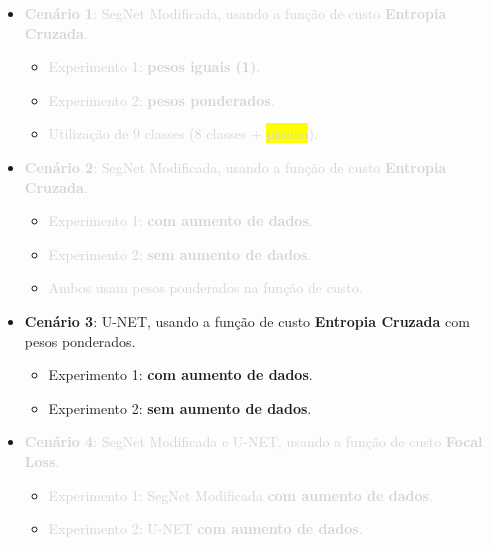 \documentclass[%
  10pt,%
  aspectratio = 169,%
  compress,%
  t,%
  english,%
  brazilian,%
  tikz,
]{beamer}
\begin{document}
\begin{frame}

    \begin{itemize}
        \item \textcolor{lightgray}{\textbf{Cenário 1}: SegNet Modificada, usando a função de custo \textbf{Entropia Cruzada}.}
        \begin{itemize}
            \item \textcolor{lightgray}{Experimento 1: \textbf{pesos iguais (1)}.}
            \item \textcolor{lightgray}{Experimento 2: \textbf{pesos ponderados}.}
            \item \textcolor{lightgray}{Utilização de 9 classes (8 classes + \colorbox{yellow}{piscina}).}
        \end{itemize}
    \end{itemize}
    \begin{itemize}
        \item \textcolor{lightgray}{\textbf{Cenário 2}: SegNet Modificada, usando a função de custo \textbf{Entropia Cruzada}.}
        \begin{itemize}
            \item \textcolor{lightgray}{Experimento 1: \textbf{com aumento de dados}.}
            \item \textcolor{lightgray}{Experimento 2: \textbf{sem aumento de dados}.}
            \item \textcolor{lightgray}{Ambos usam pesos ponderados na função de custo.}
        \end{itemize}
    \end{itemize}
    \begin{itemize}
        \item \textbf{Cenário 3}: U-NET, usando a função de custo \textbf{Entropia Cruzada} com pesos ponderados.
        \begin{itemize}
            \item Experimento 1: \textbf{com aumento de dados}.
            \item Experimento 2: \textbf{sem aumento de dados}.
        \end{itemize}
    \end{itemize}
    \begin{itemize}
        \item \textcolor{lightgray}{\textbf{Cenário 4}: SegNet Modificada e U-NET, usando a função de custo \textbf{Focal Loss}.}
        \begin{itemize}
            \item \textcolor{lightgray}{Experimento 1: SegNet Modificada \textbf{com aumento de dados}.}
            \item \textcolor{lightgray}{Experimento 2: U-NET \textbf{com aumento de dados}.}
        \end{itemize}
    \end{itemize}
    
\end{frame}
\end{document}
